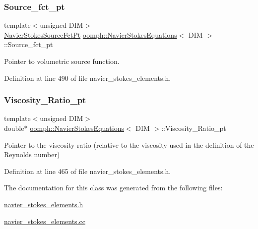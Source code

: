 \subsubsection{\texorpdfstring{Source\+\_\+fct\+\_\+pt}{Source\_fct\_pt}}
{\footnotesize\ttfamily template$<$unsigned D\+IM$>$ \\
\hyperlink{classoomph_1_1NavierStokesEquations_a1d69b671e6d4c0e75a02d6fa3dab478f}{Navier\+Stokes\+Source\+Fct\+Pt} \hyperlink{classoomph_1_1NavierStokesEquations}{oomph\+::\+Navier\+Stokes\+Equations}$<$ D\+IM $>$\+::Source\+\_\+fct\+\_\+pt\hspace{0.3cm}{\ttfamily [protected]}}



Pointer to volumetric source function. 



Definition at line 490 of file navier\+\_\+stokes\+\_\+elements.\+h.

\mbox{\label{classoomph_1_1NavierStokesEquations_a02b887cb89971e92016bddc89f6bfe7f}} 
\subsubsection{\texorpdfstring{Viscosity\+\_\+\+Ratio\+\_\+pt}{Viscosity\_Ratio\_pt}}
{\footnotesize\ttfamily template$<$unsigned D\+IM$>$ \\
double$\ast$ \hyperlink{classoomph_1_1NavierStokesEquations}{oomph\+::\+Navier\+Stokes\+Equations}$<$ D\+IM $>$\+::Viscosity\+\_\+\+Ratio\+\_\+pt\hspace{0.3cm}{\ttfamily [protected]}}



Pointer to the viscosity ratio (relative to the viscosity used in the definition of the Reynolds number) 



Definition at line 465 of file navier\+\_\+stokes\+\_\+elements.\+h.



The documentation for this class was generated from the following files\+:\begin{DoxyCompactItemize}
\item 
\hyperlink{navier__stokes__elements_8h}{navier\+\_\+stokes\+\_\+elements.\+h}\item 
\hyperlink{navier__stokes__elements_8cc}{navier\+\_\+stokes\+\_\+elements.\+cc}\end{DoxyCompactItemize}
